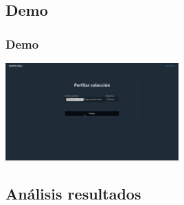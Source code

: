 \documentclass{beamer}
\begin{document}
\subsection{Demo}
\begin{frame}
\frametitle{Demo}

\begin{center}
		\includegraphics[width=0.5\textwidth]{images/demo.png}
\end{center}
	
\end{frame}
\subsection{Análisis resultados}
\end{document}
